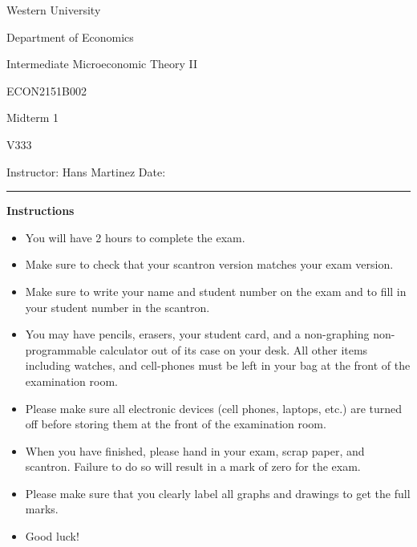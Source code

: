 \documentclass[
  12pt,
  addpoints]{exam}
\begin{document}
\begin{titlepage}
    \centering
    {\LARGE Western University\par}
    {\Large Department of Economics\par}
    \vspace{1cm}
    {\large Intermediate Microeconomic Theory II \par
    ECON2151B002 \par
    Midterm 1 \par
    V333 \par}
    \vspace{1.5cm}
    Instructor: Hans Martinez \hfill Date:\enspace\rule{4cm}{0.4pt}\par
    \vspace{2cm}
    \raggedleft
    \vfill
    {\centering 
        {\bf Instructions \par}
    }
    \raggedleft
    \begin{itemize}
        \item You will have 2 hours to complete the exam.
        \item Make sure to check that your scantron version matches your exam version.
        \item Make sure to write your name and student number on the exam and to fill in your student number in the scantron.
        \item You may have pencils, erasers, your student card, and a non-graphing non-programmable calculator out of its case on your desk. All other items including watches, and cell-phones must be left in your bag at the front of the examination room.
        \item Please make sure all electronic devices (cell phones, laptops, etc.) are turned off before storing them at the front of the examination room.
        \item When you have finished, please hand in your exam, scrap paper, and scantron. Failure to do so will result in a mark of zero for the exam.
        \item Please make sure that you clearly label all graphs and drawings to get the full marks.
        \item Good luck!
    \end{itemize}
\end{titlepage}
\newpage

\end{document}
